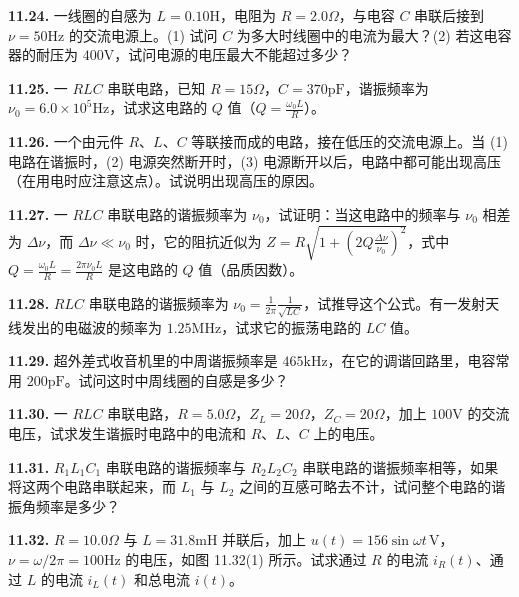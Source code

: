 \vfill
\newpage

\textbf{11.24.} 一线圈的自感为 $L = 0.10\mathrm{H}$，电阻为 $R = 2.0\Omega$，与电容 $C$ 串联后接到 $\nu = 50\mathrm{Hz}$ 的交流电源上。(1) 试问 $C$ 为多大时线圈中的电流为最大？(2) 若这电容器的耐压为 $400\mathrm{V}$，试问电源的电压最大不能超过多少？

\vfill
\newpage

\textbf{11.25.} 一 $RLC$ 串联电路，已知 $R = 15\Omega$，$C = 370\mathrm{pF}$，谐振频率为 $\nu_{0} = 6.0 \times 10^{5}\mathrm{Hz}$，试求这电路的 $Q$ 值（$\displaystyle Q = \frac{\omega_0 L}{R}$）。

\vfill
\newpage

\textbf{11.26.} 一个由元件 $R$、$L$、$C$ 等联接而成的电路，接在低压的交流电源上。当 (1) 电路在谐振时，(2) 电源突然断开时，(3) 电源断开以后，电路中都可能出现高压（在用电时应注意这点）。试说明出现高压的原因。

\vfill
\newpage

\textbf{11.27.} 一 $RLC$ 串联电路的谐振频率为 $\nu_{0}$，试证明：当这电路中的频率与 $\nu_{0}$ 相差为 $\Delta\nu$，而 $\Delta\nu \ll \nu_{0}$ 时，它的阻抗近似为 $\displaystyle Z = R\sqrt{1 + \left(2Q\frac{\Delta\nu}{\nu_{0}}\right)^{2}}$，式中 $\displaystyle Q = \frac{\omega_{0}L}{R} = \frac{2\pi\nu_{0}L}{R}$ 是这电路的 $Q$ 值（品质因数）。

\vfill
\newpage

\textbf{11.28.} $RLC$ 串联电路的谐振频率为 $\displaystyle \nu_0 = \frac{1}{2\pi}\frac{1}{\sqrt{LC}}$，试推导这个公式。有一发射天线发出的电磁波的频率为 $1.25\mathrm{MHz}$，试求它的振荡电路的 $LC$ 值。

\vfill
\newpage

\textbf{11.29.} 超外差式收音机里的中周谐振频率是 $465\mathrm{kHz}$，在它的调谐回路里，电容常用 $200\mathrm{pF}$。试问这时中周线圈的自感是多少？

\vfill
\newpage

\textbf{11.30.} 一 $RLC$ 串联电路，$R = 5.0\Omega$，$Z_{L} = 20\Omega$，$Z_{C} = 20\Omega$，加上 $100\mathrm{V}$ 的交流电压，试求发生谐振时电路中的电流和 $R$、$L$、$C$ 上的电压。

\vfill
\newpage

\textbf{11.31.} $R_{1}L_{1}C_{1}$ 串联电路的谐振频率与 $R_{2}L_{2}C_{2}$ 串联电路的谐振频率相等，如果将这两个电路串联起来，而 $L_{1}$ 与 $L_{2}$ 之间的互感可略去不计，试问整个电路的谐振角频率是多少？

\vfill
\newpage

\textbf{11.32.} $R = 10.0\Omega$ 与 $L = 31.8\mathrm{mH}$ 并联后，加上 $u(t) = 156\sin\omega t\,\mathrm{V}$，$\nu = \omega / 2\pi = 100\mathrm{Hz}$ 的电压，如图 11.32(1) 所示。试求通过 $R$ 的电流 $i_R(t)$、通过 $L$ 的电流 $i_L(t)$ 和总电流 $i(t)$。

